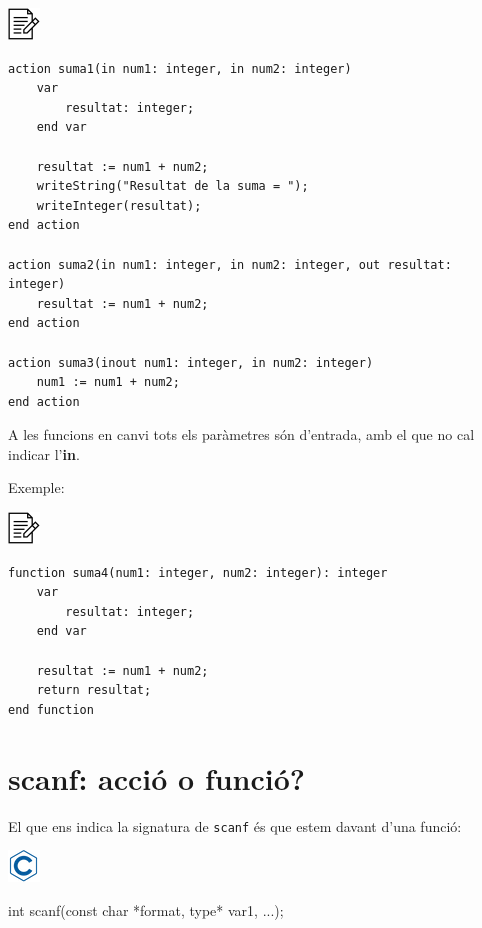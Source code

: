 \documentclass[]{book}
\newenvironment{Shaded}{\begin{snugshade}}{\end{snugshade}}
\newcommand{\DataTypeTok}[1]{\textcolor[rgb]{0.13,0.29,0.53}{#1}}
\newcommand{\NormalTok}[1]{#1}
\begin{document}
\includegraphics{./img/alg.png}

\begin{verbatim}
action suma1(in num1: integer, in num2: integer)
    var
        resultat: integer;
    end var

    resultat := num1 + num2;
    writeString("Resultat de la suma = ");
    writeInteger(resultat);
end action

action suma2(in num1: integer, in num2: integer, out resultat: integer)
    resultat := num1 + num2;
end action

action suma3(inout num1: integer, in num2: integer)
    num1 := num1 + num2;
end action
\end{verbatim}

A les funcions en canvi tots els paràmetres són d'entrada, amb el que no
cal indicar l'\textbf{in}.

Exemple:

\includegraphics{./img/alg.png}

\begin{verbatim}
function suma4(num1: integer, num2: integer): integer
    var
        resultat: integer;
    end var

    resultat := num1 + num2;
    return resultat;
end function
\end{verbatim}

\section{scanf: acció o funció?}\label{scanf-accio-o-funcio}

El que ens indica la signatura de \texttt{scanf} és que estem davant
d'una funció:

\includegraphics{./img/c.png}

\begin{Shaded}
\begin{Highlighting}[]
\DataTypeTok{int}\NormalTok{ scanf(}\DataTypeTok{const} \DataTypeTok{char}\NormalTok{ *format, type* var1, ...);}
\end{Highlighting}
\end{Shaded}
\end{document}
